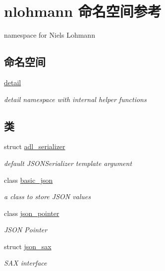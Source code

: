 \hypertarget{namespacenlohmann}{}\section{nlohmann 命名空间参考}
\label{namespacenlohmann}


namespace for Niels Lohmann  


\subsection*{命名空间}
\begin{DoxyCompactItemize}
\item 
 \mbox{\hyperlink{namespacenlohmann_1_1detail}{detail}}
\begin{DoxyCompactList}\small\item\em detail namespace with internal helper functions \end{DoxyCompactList}\end{DoxyCompactItemize}
\subsection*{类}
\begin{DoxyCompactItemize}
\item 
struct \mbox{\hyperlink{structnlohmann_1_1adl__serializer}{adl\+\_\+serializer}}
\begin{DoxyCompactList}\small\item\em default J\+S\+O\+N\+Serializer template argument \end{DoxyCompactList}\item 
class \mbox{\hyperlink{classnlohmann_1_1basic__json}{basic\+\_\+json}}
\begin{DoxyCompactList}\small\item\em a class to store J\+S\+ON values \end{DoxyCompactList}\item 
class \mbox{\hyperlink{classnlohmann_1_1json__pointer}{json\+\_\+pointer}}
\begin{DoxyCompactList}\small\item\em J\+S\+ON Pointer \end{DoxyCompactList}\item 
struct \mbox{\hyperlink{structnlohmann_1_1json__sax}{json\+\_\+sax}}
\begin{DoxyCompactList}\small\item\em S\+AX interface \end{DoxyCompactList}\end{DoxyCompactItemize}
